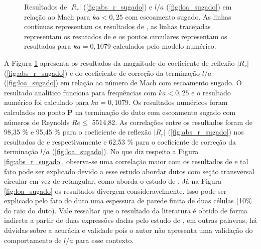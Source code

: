 \begin{figure}[ht!]
\begin{subfigure}{\scaleA \textwidth}
  
\end{subfigure}%
\begin{subfigure}{\scaleA \textwidth}
  
\end{subfigure}
\caption[Resultados de $|R_{r}|$ e $l/a$ em relação ao número de Mach para baixas frequências com escoamento sugado]{Resultados de $|R_{r}|$ (\ref{fig:abs_r_sugado}) e $l/a$ (\ref{fig:loa_sugado}) em relação ao Mach para $ka < 0,25$ com escoamento sugado. As linhas contínuas representam os resultados de , as linhas tracejadas representam os resutados de  e os pontos circulares representam os resultados para $ka = 0,1079$ calculados pelo modelo numérico.}
\label{fig:resultados_sugado}
\end{figure}

A Figura \ref{fig:resultados_sugado} apresenta os resultados da magnitude do coeficiente de reflexão $|R_{r}|$ (\ref{fig:abs_r_sugado}) e do coeficiente de correção da terminação $l/a$ (\ref{fig:loa_sugado}) em relação ao número de Mach com escoamento sugado. O resultado analítico funciona para frequências com $ka < 0,25$ e o resultado numérico foi calculado para $ka = 0,1079$. Os resultados numéricos foram calculados no ponto $\textbf{P}$ na terminação do duto com escoamento sugado com números de Reynolds $Re \leq$ 5514,82. As correlações entre os resultados foram de 98,35 \% e 95,45 \% para o coeficiente de reflexão $|R_{r}|$ (\ref{fig:abs_r_sugado}) nos resultados de  e  respectivamente e 62,53 \% para o coeficiente de correção da terminação $l/a$ (\ref{fig:loa_sugado}). No que diz respeito a Figura \ref{fig:abs_r_sugado}, observa-se uma correlação maior com os resultados de  e tal fato pode ser explicado devido a esse estudo abordar dutos com seção transversal circular em vez de retangular, como aborda o estudo de . Já na Figura \ref{fig:loa_sugado} os resultados divergem consideravelmente. Isso pode ser explicado pelo fato do duto uma espessura de parede finita de duas células (10\% do raio do duto). Vale ressaltar que o resultado da literatura é obtido de forma indireta a partir de duas expressões dadas pelo estudo de , em outras palavras, há dúvidas sobre a acurácia e validade pois o autor não apresenta uma validação do comportamento de $l/a$ para esse contexto.

